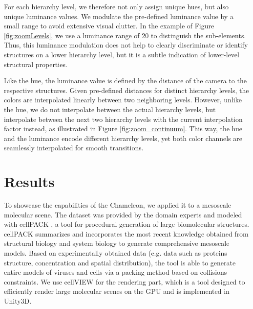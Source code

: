 \documentclass[review,journal]{vgtc}         %
\begin{document}
	
	For each hierarchy level, we therefore not only assign unique hues, but also unique luminance values. 
	We modulate the pre-defined luminance value by a small range to avoid extensive visual clutter. 
	In the example of Figure \ref{fig:zoomLevels}, we use a luminance range of 20 to distinguish the sub-elements. 
	Thus, this luminance modulation does not help to clearly discriminate or identify structures on a lower hierarchy level, but it is a subtle indication of lower-level structural properties. 
	
	Like the hue, the luminance value is defined by the distance of the camera to the respective structures. 
	Given pre-defined distances for distinct hierarchy levels, the colors are interpolated linearly between two neighboring levels. 
	However, unlike the hue, we do not interpolate between the actual hierarchy levels, but interpolate between the next two hierarchy levels with the current interpolation factor instead, as illustrated in Figure \ref{fig:zoom_continuum}. 
	This way, the hue and the luminance encode different hierarchy levels, yet both color channels are seamlessly interpolated for smooth transitions. 
		
	\section{Results}
	\label{sec:results}
	
	To showcase the capabilities of the Chameleon, we applied it to a mesoscale molecular scene. 
	The dataset was provided by the domain experts and modeled with cellPACK \cite{johnson2015cellpack}, a tool for procedural generation of large biomolecular structures.
	cellPACK summarizes and incorporates the most recent knowledge obtained from structural biology and system biology to generate comprehensive mesoscale models. 
	Based on experimentally obtained data (e.g. data such as proteins structure, concentration and spatial distribution), the tool is able to generate entire models of viruses and cells via a packing method based on collisions constraints.
	We use cellVIEW \cite{muzic2015cellview} for the rendering part, which is a tool designed to efficiently render large molecular scenes on the GPU and is implemented in Unity3D. \\
	
\end{document}
